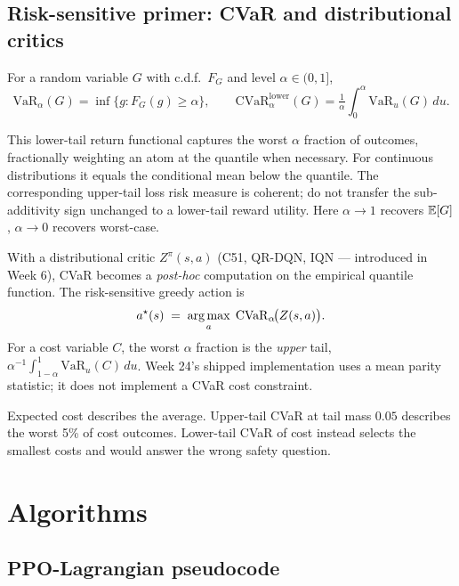 \documentclass[11pt,oneside]{scrbook}
\begin{document}
\section{Risk-sensitive primer: CVaR and distributional critics}

\begin{definition}\label{def:cvar}
For a random variable $G$ with c.d.f.\ $F_G$ and level $\alpha \in (0, 1]$,
\[
   \mathrm{VaR}_\alpha(G) = \inf\{ g : F_G(g) \geq \alpha\},\qquad
   \mathrm{CVaR}_\alpha^{\mathrm{lower}}(G) = \tfrac{1}{\alpha} \int_0^\alpha \mathrm{VaR}_u(G)\, du.
\]
\end{definition}

This lower-tail return functional captures the worst $\alpha$ fraction
of outcomes, fractionally weighting an atom at the quantile when necessary.
For continuous distributions it equals the conditional mean below the quantile.
The corresponding upper-tail loss risk measure is coherent; do not transfer
the sub-additivity sign unchanged to a lower-tail reward utility. Here $\alpha \to 1$ recovers $\mathbb{E}[G]$, $\alpha \to 0$ recovers
worst-case.

With a distributional critic $Z^\pi(s,a)$ (C51, QR-DQN, IQN --- introduced in
Week 6), CVaR becomes a \emph{post-hoc} computation on the empirical quantile
function. The risk-sensitive greedy action is
\[
   a^\star(s) \;=\; \operatorname*{arg\,max}_a\; \mathrm{CVaR}_\alpha\!\bigl(Z(s,a)\bigr).
\]
For a cost variable $C$, the worst $\alpha$ fraction is the \emph{upper}
tail, $\alpha^{-1}\int_{1-\alpha}^1\mathrm{VaR}_u(C)\,du$.
Week 24's shipped implementation uses a mean parity statistic; it does not
implement a CVaR cost constraint.

\begin{intuition}
Expected cost describes the average. Upper-tail CVaR at tail mass $0.05$
describes the worst 5\% of cost outcomes. Lower-tail CVaR of cost instead
selects the smallest costs and would answer the wrong safety question.
\end{intuition}

\chapter{Algorithms}

\section{PPO-Lagrangian pseudocode}
\end{document}
